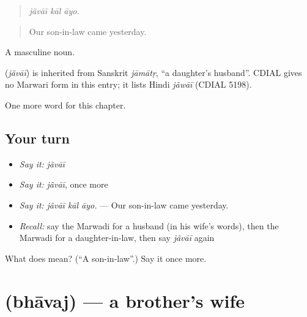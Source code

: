 \begin{quote}
  
\end{quote}

\begin{quote}
\emph{jãvāī kāl āyo.}
\end{quote}

\begin{quote}
Our son-in-law came yesterday.
\end{quote}

A masculine noun.

\begin{cousinweb}
\textbf{} (\emph{jãvāī}) is inherited from Sanskrit \emph{jāmātṛ}, \textquotedblleft{}a daughter's husband\textquotedblright{}. CDIAL gives no Marwari form in this entry; it lists Hindi \emph{jãwāī} (CDIAL 5198).
\end{cousinweb}

\begin{grammarlens}[title={What you've built}]
One more word for this chapter.
\end{grammarlens}

\subsection*{Your turn}
\begin{itemize}
\raggedright
  \item \emph{Say it:} \emph{jãvāī}
  \item \emph{Say it:} \emph{jãvāī}, once more
  \item \emph{Say it:} \emph{jãvāī kāl āyo.} — Our son-in-law came yesterday.
  \item \emph{Recall:} say the Marwadi for a husband (in his wife's words), then the Marwadi for a daughter-in-law, then say \emph{jãvāī} again
\end{itemize}

\begin{tcolorbox}[breakable,colback=teal!4,colframe=teal!35!black,title={Before you move on}]
What does  mean? (\textquotedblleft{}A son-in-law\textquotedblright{}.) Say it once more.
\end{tcolorbox}
\section[\texorpdfstring{\mw{भावज} (bhāvaj)}{भावज (bhāvaj)}]{ (bhāvaj) — a brother's wife}

\label{lesson:MW-C260-bhavaj}



